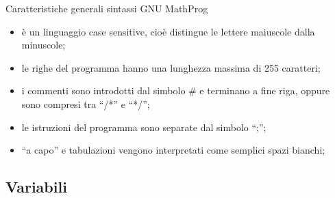 \documentclass{beamer}
\begin{document}
\begin{frame}{Caratteristiche generali sintassi GNU MathProg}
\begin{itemize}
\item \`e un linguaggio case sensitive, cio\`e distingue le lettere
maiuscole dalla minuscole;
\item le righe del programma hanno una lunghezza massima di 255 caratteri;
\item i commenti sono introdotti dal simbolo \# e terminano a fine riga, oppure sono compresi tra ``/*'' e ``*/'';
\item le istruzioni del programma sono separate dal simbolo ``;'';
\item ``a capo'' e tabulazioni vengono interpretati come semplici spazi bianchi;
\end{itemize}
\end{frame}

\subsection{Variabili}
\end{document}
